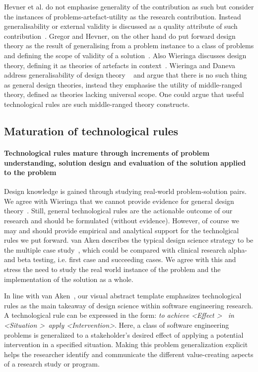 \documentclass[graybox]{svmult}
\begin{document}
Hevner et al. do not emphasise generality of the contribution as such but consider the instances of problems-artefact-utility as the research contribution. Instead generalisability or external validity is discussed as a quality attribute of such contribution~\cite{hevner_design_2004}. Gregor and Hevner, on the other hand do put forward design theory as the result of generalising from a problem instance to a class of problems and defining the scope of validity of a solution~\cite{gregor_positioning_2013}. Also Wieringa discusses design theory, defining it as theories of artefacts in context~\cite{wieringa_design_2009}. Wieringa and Daneva address generalisability of design theory ~\cite{wieringa_six_2015} and argue that there is no such thing as general design theories, instead they emphasise the utility of middle-ranged theory, defined as theories lacking universal scope. One could argue that useful technological rules are such middle-ranged theory constructs.

\subsection{Maturation of technological rules}
\paragraph{Technological rules mature through increments of problem understanding, solution design and evaluation of the solution applied to the problem} 

Design knowledge is gained through studying real-world problem-solution pairs. We agree with Wieringa that we cannot provide evidence for general design theory~\cite{wieringa_six_2015}. Still, general technological rules are the actionable outcome of our research and should be formulated (without evidence). However, of course we may and should provide empirical and analytical support for the technolgical rules we put forward. van Aken describes the typical design science strategy to be the multiple case study~\cite{van_aken_management_2004}, which could be compared with clinical research alpha- and beta testing, i.e. first case and succeeding cases. We agree with this and stress the need to study the real world instance of the problem and the implementation of the solution as a whole.

In line with van Aken~\cite{aken_management_2004}, our visual abstract template emphasizes technological rules as the main takeaway of design science within software engineering research. A technological rule can be expressed in the form: 
\emph{to achieve \textless Effect \textgreater ~ in \textless Situation \textgreater~apply \textless Intervention\textgreater}. 
Here, a class of software engineering problems is generalized to a stakeholder's desired effect of applying a potential intervention in a specified situation. 
Making this problem generalization explicit helps the researcher identify and communicate the different value-creating aspects of a research study or program. 
\end{document}
